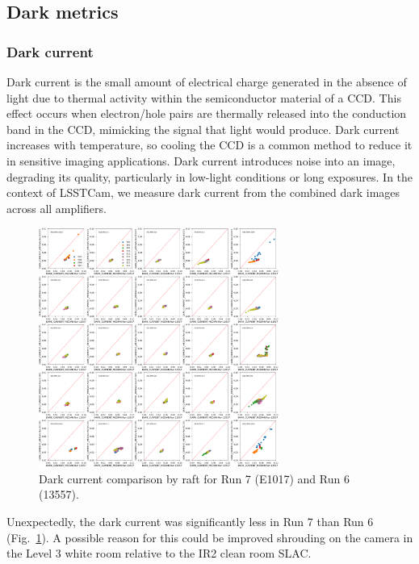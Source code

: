 \subsection{Dark metrics}\label{dark-metrics}

\subsubsection{Dark current}\label{dark-current}

Dark current is the small amount of electrical charge generated in the
absence of light due to thermal activity within the semiconductor
material of a CCD. This effect occurs when electron/hole pairs are thermally released
into the conduction band in the CCD, mimicking the signal that light would
produce. Dark current increases with temperature, so cooling the CCD is
a common method to reduce it in sensitive imaging applications. Dark
current introduces noise into an image, degrading its quality,
particularly in low-light conditions or long exposures. In the context
of LSSTCam, we measure dark current from the combined dark images across
all amplifiers.

\begin{figure}[H]
\begin{centering}
\includegraphics[width=0.7\textwidth]{sections/figures/baselineCharacterization/13557_E1071_DARK_CURRENT_MEDIAN.png}
\caption{Dark current comparison by raft for Run 7 (E1017) and Run 6 (13557).}
\label{fig:dark}
\end{centering}
\end{figure}

Unexpectedly, the dark current was significantly less in Run 7 than
Run 6 (Fig.~\ref{fig:dark}). A possible reason for this could be improved shrouding
on the camera in the Level 3 white room relative to the IR2 clean room SLAC.

